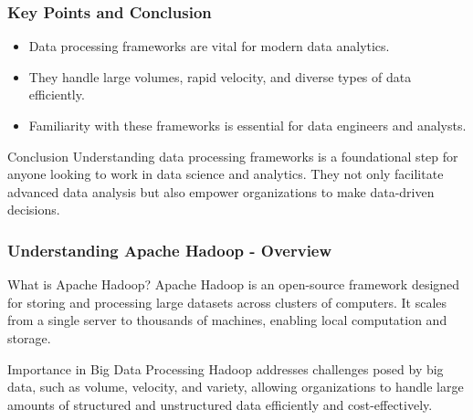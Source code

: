 \documentclass{beamer}
\begin{document}
\begin{frame}[fragile]
    \frametitle{Key Points and Conclusion}
    \begin{itemize}
        \item Data processing frameworks are vital for modern data analytics.
        \item They handle large volumes, rapid velocity, and diverse types of data efficiently.
        \item Familiarity with these frameworks is essential for data engineers and analysts.
    \end{itemize}
    
    \begin{block}{Conclusion}
        Understanding data processing frameworks is a foundational step for anyone looking to work in data science and analytics. They not only facilitate advanced data analysis but also empower organizations to make data-driven decisions.
    \end{block}
\end{frame}

\begin{frame}[fragile]
    \frametitle{Understanding Apache Hadoop - Overview}
    \begin{block}{What is Apache Hadoop?}
        Apache Hadoop is an open-source framework designed for storing and processing large datasets across clusters of computers.
        It scales from a single server to thousands of machines, enabling local computation and storage.
    \end{block}
    
    \begin{block}{Importance in Big Data Processing}
        Hadoop addresses challenges posed by big data, such as volume, velocity, and variety, allowing organizations to handle large amounts of structured and unstructured data efficiently and cost-effectively.
    \end{block}
\end{frame}
\end{document}
